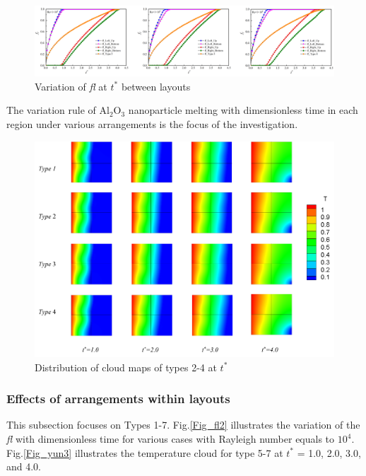 \documentclass[preprint,12pt]{elsarticle}
\begin{document}
\begin{figure}[H] 
	\centering
	\includegraphics[scale=0.65]{Fig/fl2.png}
	\caption{Variation of \textit{fl} at $ t^* $ between layouts } 
	\label{Fig_fl} 
\end{figure}
The variation rule of Al$_2$O$_3$ nanoparticle melting with dimensionless time in each region under various arrangements is the focus of the investigation. 
\begin{figure}[H]
	\centering 
	\includegraphics[scale=0.4]{Fig/yun2.png}
	\caption{Distribution of cloud maps of types 2-4 at $ t^* $} 
	\label{Fig_yun2} 
\end{figure}

\subsubsection{Effects of arrangements within layouts}
This subsection focuses on Types 1-7. Fig.\ref{Fig_fl2} illustrates the variation of the \textit{fl} with dimensionless time for various cases with Rayleigh number equals to $ 10^4 $. Fig.\ref{Fig_yun3}  illustrates the temperature cloud for type 5-7 at \textit{$ t^* $} = 1.0, 2.0, 3.0, and 4.0. 
\end{document}

